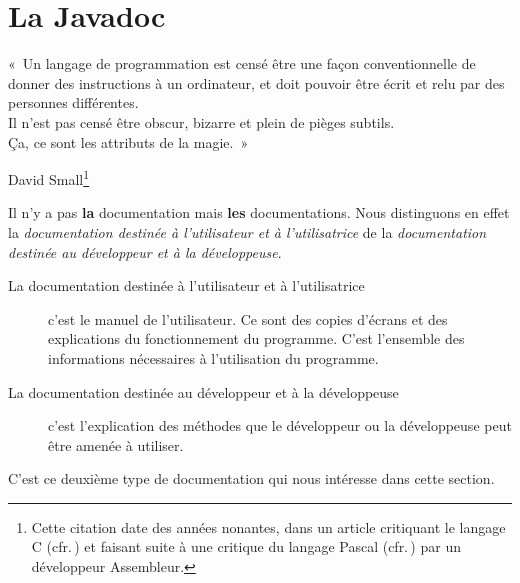 \chapter{La Javadoc}
\label{chap:javadoc}

\begin{Exergue}
	
	«~Un langage de programmation est censé être une façon conventionnelle de
	donner des instructions à un ordinateur, et doit pouvoir être écrit et relu
	par des personnes différentes. \\Il n'est pas censé être obscur, bizarre et
	plein de pièges subtils. \\Ça, ce sont les attributs de la magie.~»

	\begin{flushright}

		David Small\footnote{Cette citation date des années nonantes, dans un
			article critiquant le langage C (cfr.\,\cite{davidsmall2}) et
			faisant suite à une critique du langage Pascal
			(cfr.\,\cite{davidsmall1}) par un développeur Assembleur.}
	
	\end{flushright}

\end{Exergue}

Il n'y a pas \textbf{la} documentation mais \textbf{les} documentations. Nous
distinguons en effet la \emph{documentation destinée à l'utilisateur et
à l'utilisatrice} de la \emph{documentation destinée au développeur et à la
développeuse}. 

\begin{description}

	\item[La documentation destinée à l'utilisateur et à l'utilisatrice] c'est
		le manuel de l'utilisateur. Ce sont des copies d'écrans et des
		explications du fonctionnement du programme. C'est l'ensemble des
		informations nécessaires à l'utilisation du programme. 

	\item[La documentation destinée au développeur et à la développeuse] c'est
		l'explication des méthodes que le développeur ou la développeuse
		peut être amenée à utiliser. 
		
\end{description}

C'est ce deuxième type de documentation qui nous intéresse dans cette section. 


